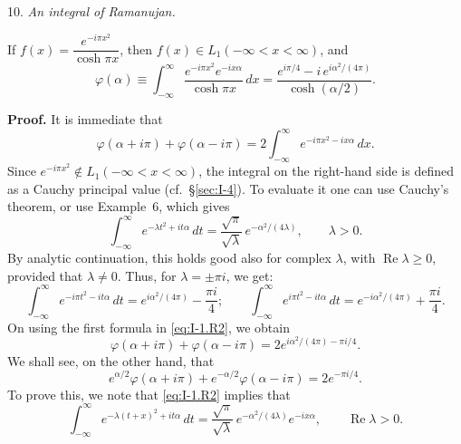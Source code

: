 10. \emph{An integral of Ramanujan.}

If $f(x)=\dfrac{e^{-i\pi x^2}}{\cosh\pi x}$, then $f(x)\in L_1(-\infty<x<\infty)$, and
\begin{equation}\label{eq:I-1.Ramanujan}
\varphi(\alpha)\equiv\int_{-\infty}^{\infty}\frac{e^{-i\pi x^2}e^{-ix\alpha}}{\cosh\pi x}\,dx
=\frac{e^{i\pi/4}-i\,e^{i\alpha^2/(4\pi)}}{\cosh(\alpha/2)}.
\end{equation}

\noindent\textbf{Proof.}
It is immediate that
\begin{equation}\label{eq:I-1.R1}
\varphi(\alpha+i\pi)+\varphi(\alpha-i\pi)
=2\int_{-\infty}^{\infty}e^{-i\pi x^2-ix\alpha}\,dx.
\end{equation}
Since $e^{-i\pi x^2}\notin L_1(-\infty<x<\infty)$, the integral on the right-hand side is defined as a Cauchy principal value (cf.\ \S\ref{sec:I-4}). To evaluate it one can use Cauchy's theorem, or use Example~6, which gives
\begin{equation}\label{eq:I-1.R2}
\int_{-\infty}^{\infty}e^{-\lambda t^2+it\alpha}\,dt
=\frac{\sqrt\pi}{\sqrt\lambda}\,e^{-\alpha^2/(4\lambda)},
\qquad\lambda>0.
\end{equation}
By analytic continuation, this holds good also for complex $\lambda$, with $\operatorname{Re}\lambda\ge 0$, provided that $\lambda\neq 0$. Thus, for $\lambda=\pm\pi i$, we get:
\begin{equation}\label{eq:I-1.R3}
\int_{-\infty}^{\infty}e^{-i\pi t^2-it\alpha}\,dt
=e^{i\alpha^2/(4\pi)}-\frac{\pi i}{4};
\qquad
\int_{-\infty}^{\infty}e^{i\pi t^2-it\alpha}\,dt
=e^{-i\alpha^2/(4\pi)}+\frac{\pi i}{4}.
\end{equation}
On using the first formula in \eqref{eq:I-1.R2}, we obtain
\begin{equation}\label{eq:I-1.R4}
\varphi(\alpha+i\pi)+\varphi(\alpha-i\pi)
=2e^{i\alpha^2/(4\pi)-\pi i/4}.
\end{equation}
We shall see, on the other hand, that
\begin{equation}\label{eq:I-1.R5}
e^{\alpha/2}\varphi(\alpha+i\pi)+e^{-\alpha/2}\varphi(\alpha-i\pi)=2e^{-\pi i/4}.
\end{equation}
To prove this, we note that \eqref{eq:I-1.R2} implies that
\begin{equation}\label{eq:I-1.R6}
\int_{-\infty}^{\infty}e^{-\lambda(t+x)^2+it\alpha}\,dt
=\frac{\sqrt\pi}{\sqrt\lambda}\,e^{-\alpha^2/(4\lambda)}e^{-ix\alpha},
\qquad\operatorname{Re}\lambda>0.
\end{equation}
